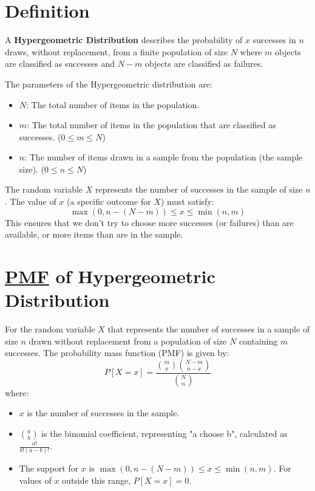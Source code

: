 \section{Definition}
\label{sec:definition-hypergeometric-distribution}

\begin{definition}
  A \textbf{Hypergeometric Distribution} describes the probability of \(x\) successes in \(n\) draws, without replacement, from a finite population of size \(N\) where \(m\) objects are classified as successes and \(N-m\) objects are classified as failures.

  The parameters of the Hypergeometric distribution are:
  \begin{itemize}
    \item \(N\): The total number of items in the population.
    \item \(m\): The total number of items in the population that are classified as successes. (\(0 \le m \le N\))
    \item \(n\): The number of items drawn in a sample from the population (the sample size). (\(0 \le n \le N\))
  \end{itemize}
  The random variable \(X\) represents the number of successes in the sample of size \(n\). The value of \(x\) (a specific outcome for \(X\)) must satisfy:
  \[ \max(0, n - (N-m)) \le x \le \min(n, m) \]
  This ensures that we don't try to choose more successes (or failures) than are available, or more items than are in the sample.
\end{definition}

\section{\href{def:probability-mass-function}{PMF} of Hypergeometric Distribution}
\label{sec:pmf-of-hypergeometric-distribution}
For the random variable \(X\) that represents the number of successes in a sample of size \(n\) drawn without replacement from a population of size \(N\) containing \(m\) successes.
The probability mass function (PMF) is given by:
\begin{equation}
  \label{eqn:pmf-of-hypergeometric-distribution}
  \boxed{P[X=x] = \frac{\binom{m}{x} \binom{N-m}{n-x}}{\binom{N}{n}}}
\end{equation}
where:
\begin{itemize}
  \item \(x\) is the number of successes in the sample.
  \item \(\binom{a}{b}\) is the binomial coefficient, representing "a choose b", calculated as \(\frac{a!}{b!(a-b)!}\).
  \item The support for \(x\) is \(\max(0, n - (N-m)) \le x \le \min(n, m)\). For values of \(x\) outside this range, \(P[X=x] = 0\).
\end{itemize}
